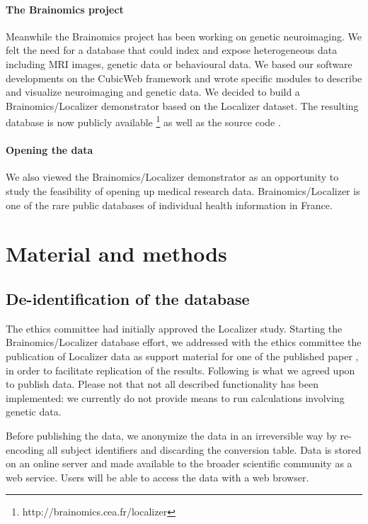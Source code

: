 \documentclass[review]{elsarticle}
\begin{document}
\paragraph{The Brainomics project} Meanwhile the Brainomics project has been working on genetic neuroimaging. We felt the need for a database that could index and expose heterogeneous data including MRI images, genetic data or behavioural data. We based our software developments on the CubicWeb framework and wrote specific modules to describe and visualize neuroimaging and genetic data. We decided to build a Brainomics/Localizer demonstrator based on the Localizer dataset. The resulting database is now publicly available \footnote{http://brainomics.cea.fr/localizer} as well as the source code \cite{Localizer}.

\paragraph{Opening the data} We also viewed the Brainomics/Localizer demonstrator as an opportunity to study the feasibility of opening up medical research data. Brainomics/Localizer is one of the rare public databases of individual health information in France.


\section{Material and methods}

\subsection{De-identification of the database}

The ethics committee had initially approved the Localizer study. Starting the Brainomics/Localizer database effort, we addressed with the ethics committee the publication of Localizer data as support material for one of the published paper \cite{Pinel2012}, in order to facilitate replication of the results. Following is what we agreed upon to publish data. Please not that not all described functionality has been implemented: we currently do not provide means to run calculations involving genetic data.

Before publishing the data, we anonymize the data in an irreversible way by re-encoding all subject identifiers and discarding the conversion table. Data is stored on an online server and made available to the broader scientific community as a web service. Users will be able to access the data with a web browser.
\end{document}
